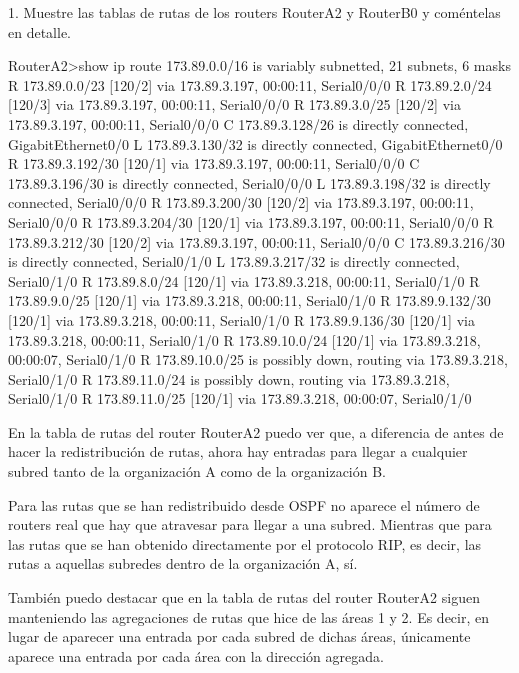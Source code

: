 \begin{ejer}
1. Muestre las tablas de rutas de los routers RouterA2 y RouterB0 y coméntelas en detalle.
\end{ejer}

\begin{listing}[style=consola]
RouterA2>show ip route
     173.89.0.0/16 is variably subnetted, 21 subnets, 6 masks
R       173.89.0.0/23 [120/2] via 173.89.3.197, 00:00:11, Serial0/0/0
R       173.89.2.0/24 [120/3] via 173.89.3.197, 00:00:11, Serial0/0/0
R       173.89.3.0/25 [120/2] via 173.89.3.197, 00:00:11, Serial0/0/0
C       173.89.3.128/26 is directly connected, GigabitEthernet0/0
L       173.89.3.130/32 is directly connected, GigabitEthernet0/0
R       173.89.3.192/30 [120/1] via 173.89.3.197, 00:00:11, Serial0/0/0
C       173.89.3.196/30 is directly connected, Serial0/0/0
L       173.89.3.198/32 is directly connected, Serial0/0/0
R       173.89.3.200/30 [120/2] via 173.89.3.197, 00:00:11, Serial0/0/0
R       173.89.3.204/30 [120/1] via 173.89.3.197, 00:00:11, Serial0/0/0
R       173.89.3.212/30 [120/2] via 173.89.3.197, 00:00:11, Serial0/0/0
C       173.89.3.216/30 is directly connected, Serial0/1/0
L       173.89.3.217/32 is directly connected, Serial0/1/0
R       173.89.8.0/24 [120/1] via 173.89.3.218, 00:00:11, Serial0/1/0
R       173.89.9.0/25 [120/1] via 173.89.3.218, 00:00:11, Serial0/1/0
R       173.89.9.132/30 [120/1] via 173.89.3.218, 00:00:11, Serial0/1/0
R       173.89.9.136/30 [120/1] via 173.89.3.218, 00:00:11, Serial0/1/0
R       173.89.10.0/24 [120/1] via 173.89.3.218, 00:00:07, Serial0/1/0
R       173.89.10.0/25 is possibly down, routing via 173.89.3.218, Serial0/1/0
R       173.89.11.0/24 is possibly down, routing via 173.89.3.218, Serial0/1/0
R       173.89.11.0/25 [120/1] via 173.89.3.218, 00:00:07, Serial0/1/0
\end{listing}
\par En la tabla de rutas del router RouterA2 puedo ver que, a diferencia de antes de hacer la redistribución de rutas, ahora hay entradas para llegar a cualquier subred tanto de la organización A como de la organización B.
\par Para las rutas que se han redistribuido desde OSPF no aparece el número de routers real que hay que atravesar para llegar a una subred. Mientras que para las rutas que se han obtenido directamente por el protocolo RIP, es decir, las rutas a aquellas subredes dentro de la organización A, sí.
\par También puedo destacar que en la tabla de rutas del router RouterA2 siguen manteniendo las agregaciones de rutas que hice de las áreas 1 y 2. Es decir, en lugar de aparecer una entrada por cada subred de dichas áreas, únicamente aparece una entrada por cada área con la dirección agregada.
